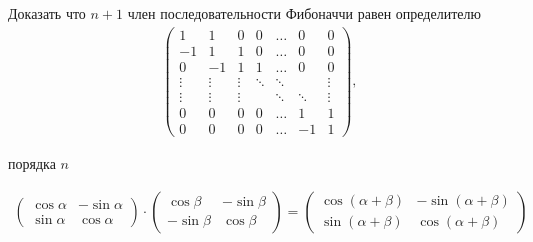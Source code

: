 \begin{prb}
    Доказать что $n + 1$ член последовательности Фибоначчи равен определителю
    \begin{gather*}
        \left(\begin{array}{ccccccc}
    1 & 1 & 0 & 0 & \ldots & 0 & 0 \\
    -1 & 1 & 1 & 0 & \ldots & 0 & 0 \\
    0 & -1 & 1 & 1 & \ldots & 0 & 0 \\
    \vdots & \vdots & \vdots & \ddots & \ddots & & \vdots \\
    \vdots & \vdots & \vdots & & \ddots & \ddots & \vdots \\
    0 & 0 & 0 & 0 & \ldots & 1 & 1 \\
    0 & 0 & 0 & 0 & \ldots & -1 & 1
    \end{array}\right),
    \end{gather*}
    
    порядка $n$
\end{prb}

\begin{sol}
    
\end{sol}

\begin{nb}

\begin{gather*}
    \left(
    \begin{array}{cc}
    \cos{\alpha} & -\sin{\alpha} \\
    \sin{\alpha} & \cos{\alpha}
    \end{array}
    \right)
    \cdot
    \left(
    \begin{array}{cc}
    \cos{\beta} & -\sin{\beta} \\
    -\sin{\beta} & \cos{\beta}
    \end{array}
    \right) =
    \left(
    \begin{array}{cc}
    \cos{(\alpha + \beta)} & -\sin{(\alpha + \beta)} \\
    \sin{(\alpha + \beta)} & \cos{(\alpha + \beta)}
    \end{array}
    \right)
\end{gather*}
\end{nb}

